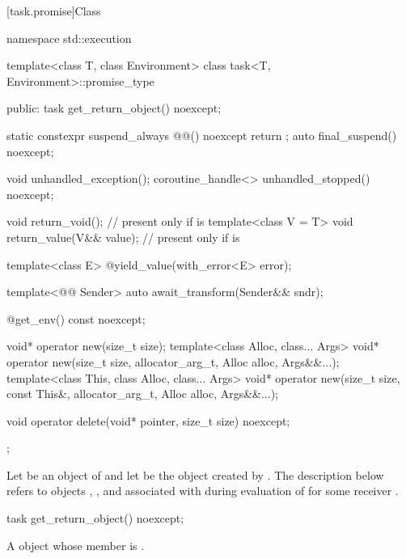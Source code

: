 [task.promise]{Class }

\begin{codeblock}
namespace std::execution {
  template<class T, class Environment>
  class task<T, Environment>::promise_type {
  public:
    task get_return_object() noexcept;

    static constexpr suspend_always @@() noexcept { return {}; }
    auto final_suspend() noexcept;

    void unhandled_exception();
    coroutine_handle<> unhandled_stopped() noexcept;

    void return_void();                 // present only if  is 
    template<class V = T>
      void return_value(V&& value);     // present only if  is 

    template<class E>
      @\unspec@ yield_value(with_error<E> error);

    template<@@ Sender>
      auto await_transform(Sender&& sndr);

    @\unspec@ get_env() const noexcept;

    void* operator new(size_t size);
    template<class Alloc, class... Args>
      void* operator new(size_t size, allocator_arg_t, Alloc alloc, Args&&...);
    template<class This, class Alloc, class... Args>
      void* operator new(size_t size, const This&, allocator_arg_t, Alloc alloc, Args&&...);

    void operator delete(void* pointer, size_t size) noexcept;
  };
}
\end{codeblock}

\pnum
Let  be an object of 
and let  be the  object
created by .
The description below
refers to objects ,
,
and 
associated with 
during evaluation of 
for some receiver .

%
\begin{itemdecl}
task get_return_object() noexcept;
\end{itemdecl}
\begin{itemdescr}
\pnum
\returns
A  object whose member  is
.
\end{itemdescr}

